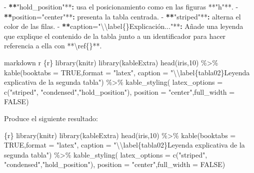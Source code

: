 \documentclass[11pt,a4paper,oneside,]{article}
\newenvironment{Shaded}{\begin{snugshade}}{\end{snugshade}}
\newcommand{\AttributeTok}[1]{\textcolor[rgb]{0.77,0.63,0.00}{#1}}
\newcommand{\ErrorTok}[1]{\textcolor[rgb]{0.64,0.00,0.00}{\textbf{#1}}}
\newcommand{\NormalTok}[1]{#1}
\newcommand{\SpecialCharTok}[1]{\textcolor[rgb]{0.00,0.00,0.00}{#1}}
\newcommand{\StringTok}[1]{\textcolor[rgb]{0.31,0.60,0.02}{#1}}
\numberwithin{dummy}{section}
\theoremstyle{ocrenumbox}
\theoremstyle{blacknumex}
\theoremstyle{blacknumbox}
\theoremstyle{ocrenum}
\theoremstyle{ocrenum}
\begin{document}
\begin{Shaded}
\begin{Highlighting}[numbers=left,,]
\SpecialCharTok{{-}} \ErrorTok{**}\StringTok{\textasciigrave{}}\AttributeTok{"hold\_position"}\StringTok{\textasciigrave{}}\SpecialCharTok{**}\ErrorTok{:}\NormalTok{ usa el posicionamiento como en las figuras }\SpecialCharTok{**}\StringTok{"h"}\SpecialCharTok{**}\NormalTok{.}
\SpecialCharTok{{-}} \ErrorTok{**}\StringTok{\textasciigrave{}}\AttributeTok{position="center"}\StringTok{\textasciigrave{}}\SpecialCharTok{**}\ErrorTok{:}\NormalTok{ presenta la tabla centrada.}
\SpecialCharTok{{-}} \ErrorTok{**}\StringTok{\textasciigrave{}}\AttributeTok{"striped"}\StringTok{\textasciigrave{}}\SpecialCharTok{**}\ErrorTok{:}\NormalTok{ alterna el color de las filas.}
\SpecialCharTok{{-}} \ErrorTok{**}\StringTok{\textasciigrave{}}\AttributeTok{caption="}\SpecialCharTok{\textbackslash{}\textbackslash{}}\AttributeTok{label\{\}Explicación..."}\StringTok{\textasciigrave{}}\SpecialCharTok{**}\ErrorTok{:}\NormalTok{ Añade una leyenda que explique el contenido de la tabla junto a un identificador para hacer referencia a ella con }\SpecialCharTok{**}\StringTok{\textasciigrave{}}\SpecialCharTok{\textbackslash{}r}\AttributeTok{ef\{\}}\StringTok{\textasciigrave{}}\SpecialCharTok{**}\NormalTok{.}

\StringTok{\textasciigrave{}\textasciigrave{}\textasciigrave{}\textasciigrave{}}\NormalTok{markdown}
\StringTok{\textasciigrave{}}\AttributeTok{r \textquotesingle{}\textquotesingle{}}\StringTok{\textasciigrave{}\textasciigrave{}\textasciigrave{}\textasciigrave{}}\AttributeTok{\{r\}}
\AttributeTok{library(knitr)}
\AttributeTok{library(kableExtra) }
\AttributeTok{head(iris,10) \%\textgreater{}\%}
\AttributeTok{ kable(booktabs = TRUE,format = "latex",}
\AttributeTok{  caption = "}\SpecialCharTok{\textbackslash{}\textbackslash{}}\AttributeTok{label\{tabla02\}Leyenda explicativa de la segunda tabla") \%\textgreater{}\%}
\AttributeTok{ kable\_styling(}
\AttributeTok{  latex\_options = c("striped", "condensed","hold\_position"), }
\AttributeTok{  position = "center",full\_width = FALSE)}
\StringTok{\textasciigrave{}\textasciigrave{}\textasciigrave{}}
\StringTok{\textasciigrave{}\textasciigrave{}\textasciigrave{}\textasciigrave{}}


\NormalTok{Produce el siguiente resultado}\SpecialCharTok{:}

\StringTok{\textasciigrave{}\textasciigrave{}\textasciigrave{}}\AttributeTok{\{r\}}
\AttributeTok{library(knitr)}
\AttributeTok{library(kableExtra) }
\AttributeTok{head(iris,10) \%\textgreater{}\%}
\AttributeTok{  kable(booktabs = TRUE,format = "latex",}
\AttributeTok{    caption = "}\SpecialCharTok{\textbackslash{}\textbackslash{}}\AttributeTok{label\{tabla02\}Leyenda explicativa de la segunda tabla") \%\textgreater{}\%}
\AttributeTok{  kable\_styling(}
\AttributeTok{    latex\_options = c("striped", "condensed","hold\_position"), }
\AttributeTok{    position = "center",full\_width = FALSE)}
\StringTok{\textasciigrave{}\textasciigrave{}\textasciigrave{}}




\end{Highlighting}
\end{Shaded}
\end{document}
